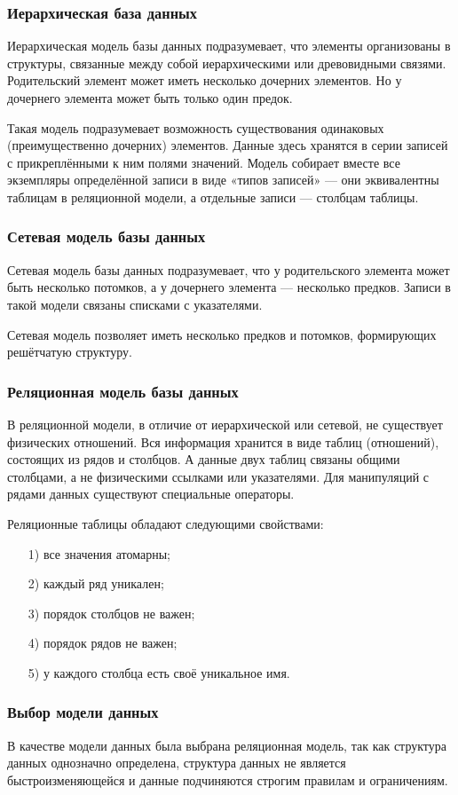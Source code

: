\subsubsection{Иерархическая база данных}
Иерархическая модель базы данных подразумевает, что элементы организованы в структуры, связанные между собой иерархическими или древовидными связями. Родительский элемент может иметь несколько дочерних элементов. Но у дочернего элемента может быть только один предок.

Такая модель подразумевает возможность существования одинаковых (преимущественно дочерних) элементов. Данные здесь хранятся в серии записей с прикреплёнными к ним полями значений. Модель собирает вместе все экземпляры определённой записи в виде «типов записей» — они эквивалентны таблицам в реляционной модели, а отдельные записи — столбцам таблицы.
\subsubsection{Сетевая модель базы данных}
Сетевая модель базы данных подразумевает, что у родительского элемента может быть несколько потомков, а у дочернего элемента — несколько предков. Записи в такой модели связаны списками с указателями. 

Сетевая модель позволяет иметь несколько предков и потомков, формирующих решётчатую структуру.
\subsubsection{Реляционная модель базы данных}
В реляционной модели, в отличие от иерархической или сетевой, не существует физических отношений. Вся информация хранится в виде таблиц (отношений), состоящих из рядов и столбцов. А данные двух таблиц связаны общими столбцами, а не физическими ссылками или указателями. Для манипуляций с рядами данных существуют специальные операторы.

Реляционные таблицы обладают следующими свойствами:
\begin{itemize}
	\item[1)] все значения атомарны;
	\item[2)] каждый ряд уникален;
	\item[3)] порядок столбцов не важен;
	\item[4)] порядок рядов не важен;
	\item[5)] у каждого столбца есть своё уникальное имя.
\end{itemize}

\subsubsection{Выбор модели данных}
В качестве модели данных была выбрана реляционная модель, так как структура данных однозначно определена, структура данных не является быстроизменяющейся и данные подчиняются строгим правилам и ограничениям.
